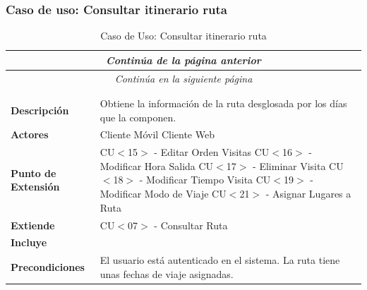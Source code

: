 \newpage
\subsubsection*{Caso de uso: Consultar itinerario ruta }
\begin{longtable}{| p{4cm} | p{10cm} |}
\endfirsthead
\multicolumn{2}{c}{\textit{Continúa de la página anterior}}\\[12pt]
\hline
\endhead
\hline
\multicolumn{2}{c}{\textit{Continúa en la siguiente página}} \\
\endfoot
\hline
\caption{Caso de Uso: Consultar itinerario ruta}\label{fig:1}\\
\endlastfoot


\hline
\multicolumn{2}{|c|}{\textbf{CU$<$14$>$ - Consultar Itinerario Ruta}} \\

\hline
\textbf{Descripción} &
Obtiene la información de la ruta desglosada por los días que la componen.\\

\hline
\textbf{Actores} &
Cliente Móvil\newline
Cliente Web\\

\hline
\textbf{Punto de Extensión} &
CU$<$15$>$ - Editar Orden Visitas\newline
CU$<$16$>$ - Modificar Hora Salida\newline
CU$<$17$>$ - Eliminar Visita\newline
CU$<$18$>$ - Modificar Tiempo Visita\newline
CU$<$19$>$ - Modificar Modo de Viaje\newline
CU$<$21$>$ - Asignar Lugares a Ruta
\\

\hline
\textbf{Extiende} &
CU$<$07$>$ - Consultar Ruta
\\

\hline
\textbf{Incluye} &
\\

\hline
\textbf{Precondiciones} &
El usuario está autenticado en el sistema.\newline
La ruta tiene unas fechas de viaje asignadas.\\


\end{longtable}

